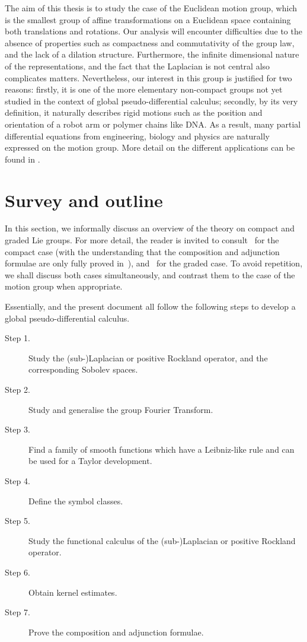 The aim of this thesis is to study the case of the Euclidean motion group,
which is the smallest group of affine transformations on a Euclidean space containing both translations and rotations.
Our analysis will encounter difficulties due to the absence of properties such as compactness and commutativity of the group law,
and the lack of a dilation structure.
Furthermore, the infinite dimensional nature of the representations,
and the fact that the Laplacian is not central also complicates matters.
Nevertheless, our interest in this group is justified for two reasons:
firstly, it is one of the more elementary non-compact groups not yet studied in the context of global pseudo-differential calculus;
secondly, by its very definition,
it naturally describes rigid motions such as the position and orientation of a robot arm or polymer chains like DNA.
As a result,
many partial differential equations from engineering, biology and physics
are naturally expressed on the motion group.
More detail on the different applications can be found in \cite{ChirikjianWang04,ChirikjianKyatkin00,Chirikjian13}.

\section{Survey and outline}

In this section,
we informally discuss an overview of the theory on compact and graded Lie groups.
For more detail,
the reader is invited to consult~\cite{RuzhanskyTurunen10} for the compact case
(with the understanding that the composition and adjunction formulae are only fully proved in~\cite{Fischer2015}),
and~\cite{FischerRuzhansky16} for the graded case.
To avoid repetition,
we shall discuss both cases simultaneously,
and contrast them to the case of the motion group when appropriate.

Essentially,
\cite{Fischer2015,FischerRuzhansky16} and the present document
all follow the following steps
to develop a global pseudo-differential calculus.

\begin{description}
    \item[Step 1.] Study the (sub-)Laplacian or positive Rockland operator,
        and the corresponding Sobolev spaces.
    \item[Step 2.] Study and generalise the group Fourier Transform.
    \item[Step 3.] Find a family of smooth functions which have a Leibniz-like rule and can be used for a Taylor development.
    \item[Step 4.] Define the symbol classes.
    \item[Step 5.] Study the functional calculus of the (sub-)Laplacian or positive Rockland operator.
    \item[Step 6.] Obtain kernel estimates.
    \item[Step 7.] Prove the composition and adjunction formulae.
\end{description}

